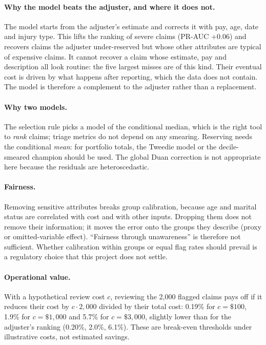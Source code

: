 \documentclass[10pt,twocolumn,letterpaper]{article}
\begin{document}
\paragraph{Why the model beats the adjuster, and where it does not.} The model starts from the adjuster's estimate and
corrects it with pay, age, date and injury type. This lifts the ranking of severe claims (PR-AUC $+0.06$) and recovers
claims the adjuster under-reserved but whose other attributes are typical of expensive claims. It cannot recover a claim
whose estimate, pay and description all look routine: the five largest misses are of this kind. Their eventual cost is
driven by what happens after reporting, which the data does not contain. The model is therefore a complement to the
adjuster rather than a replacement.

\paragraph{Why two models.} The selection rule picks a model of the conditional median, which is the right tool to
\emph{rank} claims; triage metrics do not depend on any smearing. Reserving needs the conditional \emph{mean}: for
portfolio totals, the Tweedie model or the decile-smeared champion should be used. The global Duan correction is not
appropriate here because the residuals are heteroscedastic.

\paragraph{Fairness.} Removing sensitive attributes breaks group calibration, because age and marital status are correlated with cost and with other inputs. Dropping them does not remove
their information; it moves the error onto the groups they describe (proxy or omitted-variable effect). ``Fairness through
unawareness'' is therefore not sufficient. Whether calibration within groups or equal flag rates should prevail is a
regulatory choice that this project does not settle.

\paragraph{Operational value.} With a hypothetical review cost $c$, reviewing the 2,000 flagged claims pays off if it
reduces their cost by $c \cdot 2{,}000$ divided by their total cost: 0.19\% for $c=\$100$, 1.9\% for $c=\$1{,}000$ and
5.7\% for $c=\$3{,}000$, slightly lower than for the adjuster's ranking (0.20\%, 2.0\%, 6.1\%). These are break-even
thresholds under illustrative costs, not estimated savings.
\end{document}
